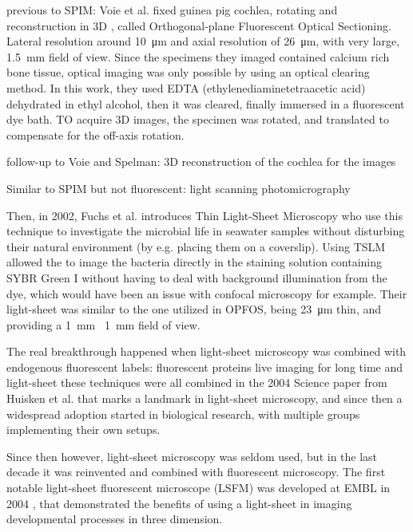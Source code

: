   previous to SPIM:
  Voie et al. fixed guinea pig cochlea, rotating and reconstruction in 3D \cite{voie_orthogonal-plane_1993}, called Orthogonal-plane Fluorescent Optical Sectioning. Lateral resolution around \SI{10}{\micro m} and axial resolution of \SI{26}{\micro m}, with very large, \SI{1.5}{mm} field of view. Since the specimens they imaged contained calcium rich bone tissue, optical imaging was only possible by using an optical clearing method. In this work, they used EDTA (ethylenediaminetetraacetic acid) dehydrated in ethyl alcohol, then it was cleared, finally immersed in a fluorescent dye bath. TO acquire 3D images, the specimen was rotated, and translated to compensate for the off-axis rotation.

  follow-up to Voie and Spelman: \cite{voie_three-dimensional_1995} 3D reconstruction of the cochlea for the images

  Similar to SPIM but not fluorescent: light scanning photomicrography \cite{huber_3d_2001}

  Then, in 2002, Fuchs et al. introduces Thin  Light-Sheet Microscopy \cite{fuchs_thin_2002} who use this technique to investigate the microbial life in seawater samples without disturbing their natural environment (by e.g. placing them on a coverslip). Using TSLM allowed the to image the bacteria directly in the staining solution containing SYBR Green I without having to deal with background illumination from the dye, which would have been an issue with confocal microscopy for example. Their light-sheet was similar to the one utilized in OPFOS, being \SI{23}{\micro m} thin, and providing a \SI{1}{mm} \ \SI{1}{mm} field of view.

  The real breakthrough happened when light-sheet microscopy was combined with 
  endogenous fluorescent labels: fluorescent proteins
  live imaging for long time
  and light-sheet
  these techniques were all combined in the 2004 Science paper from Huisken et al. that marks a landmark in light-sheet microscopy, and since then a widespread adoption started  in biological research, with multiple groups implementing their own setups.

  Since then however, light-sheet microscopy was seldom used, but in the last decade it was reinvented and combined with fluorescent microscopy. The first notable light-sheet fluorescent microscope (LSFM) was developed at EMBL in 2004 \cite{huisken_optical_2004}, that demonstrated the benefits of using a light-sheet in imaging developmental processes in three dimension.

